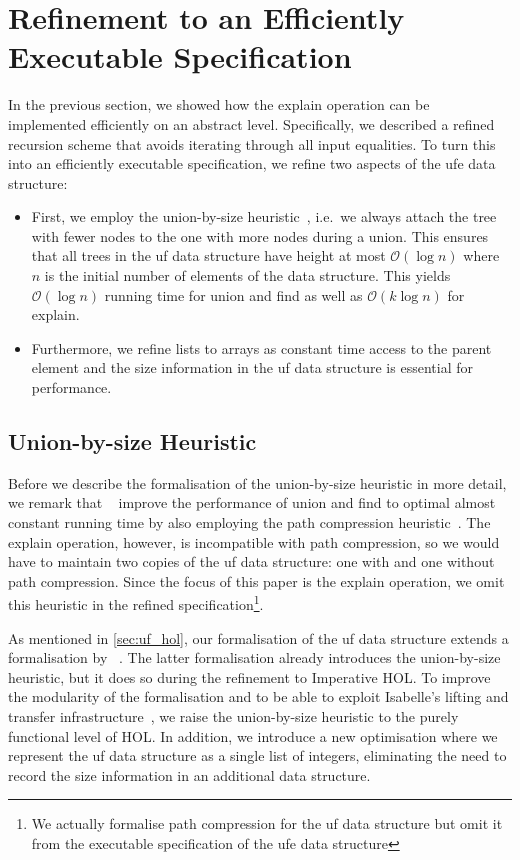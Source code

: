 \documentclass[
  sigplan,
  10pt,
  anonymous,
  review,
  ]{acmart}
\begin{document}
\section{Refinement to an Efficiently Executable Specification}
In the previous section, we showed how the explain operation can be implemented efficiently on an abstract level.
Specifically, we described a refined recursion scheme that avoids iterating through all input equalities.
To turn this into an efficiently executable specification, we refine two aspects of the \acrshort{ufe} data structure:
\begin{itemize}
  \item First, we employ the union-by-size heuristic~\cite{uf_by_size}, i.e.\ we always attach the tree with fewer nodes to the one with more nodes during a union. 
  This ensures that all trees in the \acrshort{uf} data structure have height at most $\mathcal{O}(\log n)$ where $n$ is the initial number of elements of the data structure.
  This yields $\mathcal{O}(\log n)$ running time for union and find as well as $\mathcal{O}(k \log n)$ for explain.
  \item Furthermore, we refine lists to arrays as constant time access to the parent element and the size information in the \acrshort{uf} data structure is essential for performance. 
\end{itemize}

\subsection{Union-by-size Heuristic}
Before we describe the formalisation of the union-by-size heuristic in more detail, 
we remark that \citeauthor{congcl_proofs}~\cite{congcl_proofs} improve the performance of union and find to optimal almost constant running time by also employing the path compression heuristic~\cite{uf_compress}.
The explain operation, however, is incompatible with path compression, so we would have to maintain two copies of the \acrshort{uf} data structure: one with and one without path compression.
Since the focus of this paper is the explain operation, we omit this heuristic in the refined specification\footnote{We actually formalise path compression for the \acrshort{uf} data structure but omit it from the executable specification of the \acrshort{ufe} data structure}.

As mentioned in \autoref{sec:uf_hol}, our formalisation of the \acrshort{uf} data structure extends a formalisation by \citeauthor{uf_isabelle}~\cite{uf_isabelle,uf_isabelle_afp}.
The latter formalisation already introduces the union-by-size heuristic, but it does so during the refinement to Imperative HOL.
To improve the modularity of the formalisation and to be able to exploit Isabelle's lifting and transfer infrastructure~\cite{lifting_transfer},
we raise the union-by-size heuristic to the purely functional level of HOL.
In addition, we introduce a new optimisation where we represent the \acrshort{uf} data structure as a single list of integers, eliminating the need to record the size information in an additional data structure.
\end{document}
